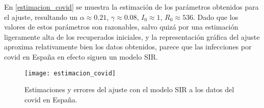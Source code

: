 En \eqref{estimacion_covid} se muestra la estimación de los parámetros obtenidos para el ajuste, resultando un $\alpha \approx 0.21$, $\gamma \approx 0.08$, $I_0 \approx 1$, $R_0 \approx 536$. Dado que los valores de estos parámetros son razonables, salvo quizá por una estimación ligeramente alta de los recuperados iniciales, y la representación gráfica del ajuste aproxima relativamente bien los datos obtenidos, parece que las infecciones por covid en España en efecto siguen un modelo SIR.

\begin{figure}
\begin{center}
\caption{Estimaciones y errores del ajuste con el modelo SIR a los datos del covid en España.}
\label{estimacion_covid}
\texttt{[image: estimacion\_covid]}
\end{center}
\end{figure}












